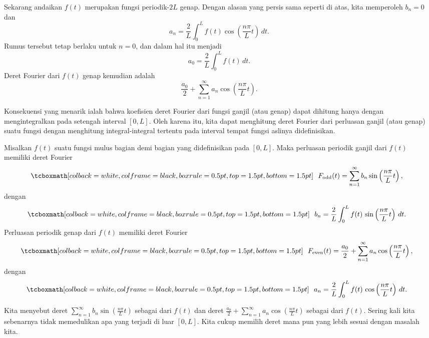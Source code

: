 Sekarang andaikan $f(t)$ merupakan fungsi periodik-$2L$ genap.
Dengan alasan yang persis
sama seperti di atas, kita memperoleh $b_n = 0$ dan
\begin{equation*}
a_n = 
\frac{2}{L} \int_{0}^L f(t) \cos \left( \frac{n \pi}{L} t \right) \, dt .
\end{equation*}
Rumus tersebut tetap berlaku untuk $n=0$, dan dalam hal itu menjadi
\begin{equation*}
a_0 = 
\frac{2}{L} \int_{0}^L f(t) \, dt .
\end{equation*}
Deret Fourier dari $f(t)$ genap kemudian adalah
\begin{equation*}
\frac{a_0}{2}
+
\sum_{n=1}^\infty a_n \cos \left( \frac{n \pi}{L} t \right) .
\end{equation*}

Konsekuensi yang menarik ialah bahwa koefisien deret Fourier dari
fungsi ganjil (atau genap) dapat dihitung hanya dengan mengintegralkan pada
setengah interval $[0,L]$.  Oleh karena itu, kita dapat menghitung deret Fourier dari
perluasan ganjil (atau genap) suatu
fungsi dengan menghitung integral-integral tertentu pada interval
tempat fungsi aslinya didefinisikan.

\begin{theorem}
Misalkan $f(t)$ suatu fungsi mulus bagian demi bagian yang didefinisikan pada $[0,L]$.
Maka perluasan periodik ganjil
dari $f(t)$ memiliki deret Fourier
\begin{equation*}
\mybxbg{~~
F_{\text{odd}}(t) = \sum_{n=1}^\infty b_n \sin \left( \frac{n \pi}{L} t
\right) ,
~~}
\end{equation*}
dengan
\begin{equation*}
\mybxbg{~~
b_n = 
\frac{2}{L} \int_{0}^L f(t)\, \sin \left( \frac{n \pi}{L} t \right) \, dt .
~~}
\end{equation*}
Perluasan periodik genap dari $f(t)$ memiliki deret Fourier
\begin{equation*}
\mybxbg{~~
F_{\text{even}}(t) = \frac{a_0}{2} + \sum_{n=1}^\infty a_n \cos \left(
\frac{n \pi}{L} t \right) ,
~~}
\end{equation*}
dengan
\begin{equation*}
\mybxbg{~~
a_n = 
\frac{2}{L} \int_{0}^L f(t)\, \cos \left( \frac{n \pi}{L} t \right) \, dt .
~~}
\end{equation*}
\end{theorem}

Kita menyebut deret $\sum_{n=1}^\infty b_n \sin \left( \frac{n \pi}{L} t\right)$ 
sebagai \emph{} dari $f(t)$ dan deret
$\frac{a_0}{2} + \sum_{n=1}^\infty a_n \cos \left( \frac{n \pi}{L} t
\right)$
sebagai \emph{} dari $f(t)$.  
Sering kali kita sebenarnya tidak memedulikan apa yang terjadi di luar $[0,L]$.
Kita cukup memilih deret mana pun yang lebih sesuai dengan masalah kita.

